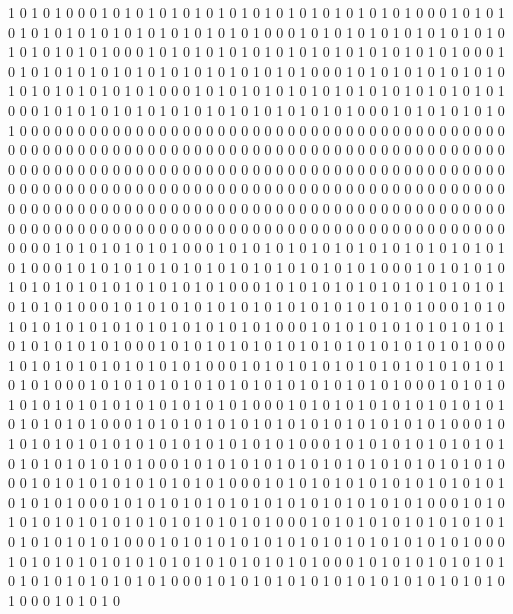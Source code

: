 1 0 1 0 1 0 0 0 1 0 1 0 1 0 1 0 1 0 1 0 1 0 1 0 1 0 1 0 1 0 1 0 1 0 1 0 0 0 1 0 1 0 1 0 1 0 1 0 1 0 1 0 1 0 1 0 1 0 1 0 1 0 1 0 1 0 0 0 1 0 1 0 1 0 1 0 1 0 1 0 1 0 1 0 1 0 1 0 1 0 1 0 1 0 1 0 0 0 1 0 1 0 1 0 1 0 1 0 1 0 1 0 1 0 1 0 1 0 1 0 1 0 1 0 1 0 0 0 1 0 1 0 1 0 1 0 1 0 1 0 1 0 1 0 1 0 1 0 1 0 1 0 1 0 1 0 0 0 1 0 1 0 1 0 1 0 1 0 1 0 1 0 1 0 1 0 1 0 1 0 1 0 1 0 1 0 0 0 1 0 1 0 1 0 1 0 1 0 1 0 1 0 1 0 1 0 1 0 1 0 1 0 1 0 1 0 0 0 1 0 1 0 1 0 1 0 1 0 1 0 1 0 1 0 1 0 1 0 1 0 1 0 1 0 1 0 0 0 1 0 1 0 1 0 1 0 1 0 1 0 
0 0 0 0 0 0 0 0 0 0 0 0 0 0 0 0 0 0 0 0 0 0 0 0 0 0 0 0 0 0 0 0 0 0 0 0 0 0 0 0 0 0 0 0 0 0 0 0 0 0 0 0 0 0 0 0 0 0 0 0 0 0 0 0 0 0 0 0 0 0 0 0 0 0 0 0 0 0 0 0 0 0 0 0 0 0 0 0 0 0 0 0 0 0 0 0 0 0 0 0 0 0 0 0 0 0 0 0 0 0 0 0 0 0 0 0 0 0 0 0 0 0 0 0 0 0 0 0 0 0 0 0 0 0 0 0 0 0 0 0 0 0 0 0 0 0 0 0 0 0 0 0 0 0 0 0 0 0 0 0 0 0 0 0 0 0 0 0 0 0 0 0 0 0 0 0 0 0 0 0 0 0 0 0 0 0 0 0 0 0 0 0 0 0 0 0 0 0 0 0 0 0 0 0 0 0 0 0 0 0 0 0 0 0 0 0 0 0 0 0 0 0 0 0 0 0 0 0 0 0 0 0 0 0 0 0 0 0 0 0 0 0 0 0 0 0 0 0 0 0 0 0 0 0 0 0 0 0 0 0 
1 0 1 0 1 0 1 0 1 0 1 0 0 0 1 0 1 0 1 0 1 0 1 0 1 0 1 0 1 0 1 0 1 0 1 0 1 0 1 0 1 0 0 0 1 0 1 0 1 0 1 0 1 0 1 0 1 0 1 0 1 0 1 0 1 0 1 0 1 0 1 0 0 0 1 0 1 0 1 0 1 0 1 0 1 0 1 0 1 0 1 0 1 0 1 0 1 0 1 0 1 0 0 0 1 0 1 0 1 0 1 0 1 0 1 0 1 0 1 0 1 0 1 0 1 0 1 0 1 0 1 0 0 0 1 0 1 0 1 0 1 0 1 0 1 0 1 0 1 0 1 0 1 0 1 0 1 0 1 0 1 0 0 0 1 0 1 0 1 0 1 0 1 0 1 0 1 0 1 0 1 0 1 0 1 0 1 0 1 0 1 0 0 0 1 0 1 0 1 0 1 0 1 0 1 0 1 0 1 0 1 0 1 0 1 0 1 0 1 0 1 0 0 0 1 0 1 0 1 0 1 0 1 0 1 0 1 0 1 0 1 0 1 0 1 0 1 0 1 0 1 0 0 0 1 0 1 0 1 0 
1 0 1 0 1 0 1 0 1 0 1 0 0 0 1 0 1 0 1 0 1 0 1 0 1 0 1 0 1 0 1 0 1 0 1 0 1 0 1 0 1 0 0 0 1 0 1 0 1 0 1 0 1 0 1 0 1 0 1 0 1 0 1 0 1 0 1 0 1 0 1 0 0 0 1 0 1 0 1 0 1 0 1 0 1 0 1 0 1 0 1 0 1 0 1 0 1 0 1 0 1 0 0 0 1 0 1 0 1 0 1 0 1 0 1 0 1 0 1 0 1 0 1 0 1 0 1 0 1 0 1 0 0 0 1 0 1 0 1 0 1 0 1 0 1 0 1 0 1 0 1 0 1 0 1 0 1 0 1 0 1 0 0 0 1 0 1 0 1 0 1 0 1 0 1 0 1 0 1 0 1 0 1 0 1 0 1 0 1 0 1 0 0 0 1 0 1 0 1 0 1 0 1 0 1 0 1 0 1 0 1 0 1 0 1 0 1 0 1 0 1 0 0 0 1 0 1 0 1 0 1 0 1 0 1 0 1 0 1 0 1 0 1 0 1 0 1 0 1 0 1 0 0 0 1 0 1 0 1 0 
1 0 1 0 1 0 1 0 1 0 1 0 0 0 1 0 1 0 1 0 1 0 1 0 1 0 1 0 1 0 1 0 1 0 1 0 1 0 1 0 1 0 0 0 1 0 1 0 1 0 1 0 1 0 1 0 1 0 1 0 1 0 1 0 1 0 1 0 1 0 1 0 0 0 1 0 1 0 1 0 1 0 1 0 1 0 1 0 1 0 1 0 1 0 1 0 1 0 1 0 1 0 0 0 1 0 1 0 1 0 1 0 1 0 1 0 1 0 1 0 1 0 1 0 1 0 1 0 1 0 1 0 0 0 1 0 1 0 1 0 1 0 1 0 1 0 1 0 1 0 1 0 1 0 1 0 1 0 1 0 1 0 0 0 1 0 1 0 1 0 1 0 1 0 1 0 1 0 1 0 1 0 1 0 1 0 1 0 1 0 1 0 0 0 1 0 1 0 1 0 1 0 1 0 1 0 1 0 1 0 1 0 1 0 1 0 1 0 1 0 1 0 0 0 1 0 1 0 1 0 1 0 1 0 1 0 1 0 1 0 1 0 1 0 1 0 1 0 1 0 1 0 0 0 1 0 1 0 1 0 
